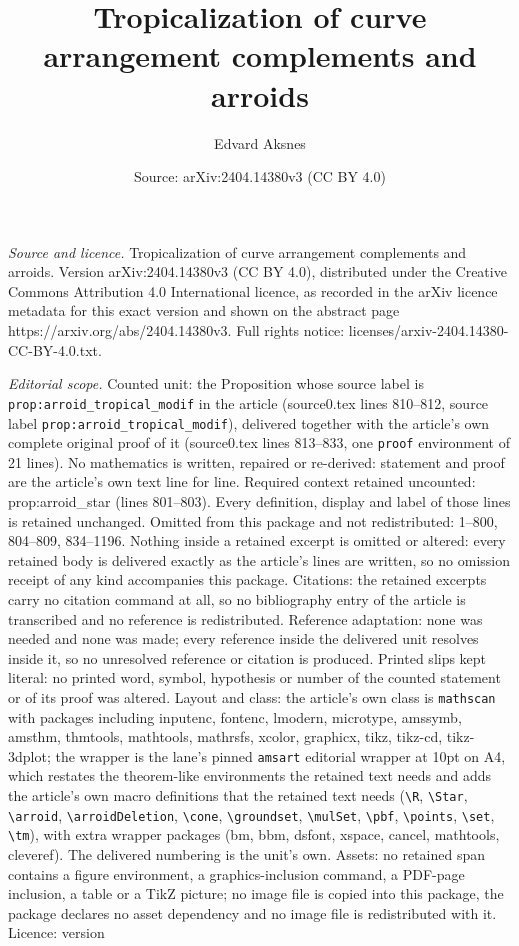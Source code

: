 \documentclass[10pt,a4paper]{amsart}
\title[Tropicalization of curve arrangement complements and arroids]{Tropicalization of curve arrangement complements and arroids}
\author{Edvard Aksnes}
\date{Source: arXiv:2404.14380v3 (CC BY 4.0)}
\begin{document}
\maketitle

\noindent\emph{Source and licence.} Tropicalization of curve arrangement complements and arroids. Version arXiv:2404.14380v3 (CC BY 4.0), distributed under the Creative Commons Attribution 4.0 International licence, as recorded in the arXiv licence metadata for this exact version and shown on the abstract page https://arxiv.org/abs/2404.14380v3. Full rights notice: licenses/arxiv-2404.14380-CC-BY-4.0.txt.\par\smallskip

\noindent\textit{Editorial scope.} Counted unit: the Proposition whose source label is \texttt{prop:arroid\_tropical\_modif} in the article (source0.tex lines 810--812, source label \texttt{prop:arroid\_tropical\_modif}), delivered together with the article's own complete original proof of it (source0.tex lines 813--833, one \texttt{proof} environment of 21 lines). No mathematics is written, repaired or re-derived: statement and proof are the article's own text line for line. Required context retained uncounted: prop:arroid\_star (lines 801--803). Every definition, display and label of those lines is retained unchanged. Omitted from this package and not redistributed: 1--800, 804--809, 834--1196. Nothing inside a retained excerpt is omitted or altered: every retained body is delivered exactly as the article's lines are written, so no omission receipt of any kind accompanies this package. Citations: the retained excerpts carry no citation command at all, so no bibliography entry of the article is transcribed and no reference is redistributed. Reference adaptation: none was needed and none was made; every reference inside the delivered unit resolves inside it, so no unresolved reference or citation is produced. Printed slips kept literal: no printed word, symbol, hypothesis or number of the counted statement or of its proof was altered. Layout and class: the article's own class is \texttt{mathscan} with packages including inputenc, fontenc, lmodern, microtype, amssymb, amsthm, thmtools, mathtools, mathrsfs, xcolor, graphicx, tikz, tikz-cd, tikz-3dplot; the wrapper is the lane's pinned \texttt{amsart} editorial wrapper at 10pt on A4, which restates the theorem-like environments the retained text needs and adds the article's own macro definitions that the retained text needs (\texttt{\textbackslash R}, \texttt{\textbackslash Star}, \texttt{\textbackslash arroid}, \texttt{\textbackslash arroidDeletion}, \texttt{\textbackslash cone}, \texttt{\textbackslash groundset}, \texttt{\textbackslash mulSet}, \texttt{\textbackslash pbf}, \texttt{\textbackslash points}, \texttt{\textbackslash set}, \texttt{\textbackslash tm}), with extra wrapper packages (bm, bbm, dsfont, xspace, cancel, mathtools, cleveref). The delivered numbering is the unit's own. Assets: no retained span contains a figure environment, a graphics-inclusion command, a PDF-page inclusion, a table or a TikZ picture; no image file is copied into this package, the package declares no asset dependency and no image file is redistributed with it. Licence: version 
\end{document}
